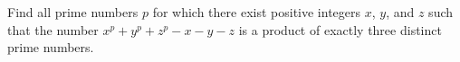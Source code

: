 Find all prime numbers $p$ for which there exist positive integers $x$, $y$, and $z$ such that the number $x^p + y^p + z^p - x - y - z$ is a product of exactly three distinct prime numbers.
